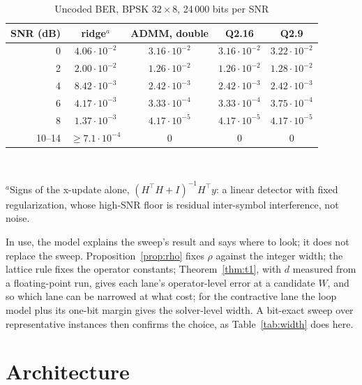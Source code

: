 \documentclass[conference]{IEEEtran}
\begin{document}
\begin{table}[t]
\centering\footnotesize\setlength{\tabcolsep}{4pt}
\caption{Uncoded BER, BPSK $32\times8$, 24\,000 bits per SNR}
\label{tab:ber}
\begin{tabular}{rcccc}
\toprule
SNR (dB) & ridge$^a$ & ADMM, double & Q2.16 & Q2.9 \\
\midrule
0  & $4.06\cdot10^{-2}$ & $3.16\cdot10^{-2}$ & $3.16\cdot10^{-2}$ & $3.22\cdot10^{-2}$ \\
2  & $2.00\cdot10^{-2}$ & $1.26\cdot10^{-2}$ & $1.26\cdot10^{-2}$ & $1.28\cdot10^{-2}$ \\
4  & $8.42\cdot10^{-3}$ & $2.42\cdot10^{-3}$ & $2.42\cdot10^{-3}$ & $2.42\cdot10^{-3}$ \\
6  & $4.17\cdot10^{-3}$ & $3.33\cdot10^{-4}$ & $3.33\cdot10^{-4}$ & $3.75\cdot10^{-4}$ \\
8  & $1.37\cdot10^{-3}$ & $4.17\cdot10^{-5}$ & $4.17\cdot10^{-5}$ & $4.17\cdot10^{-5}$ \\
10--14 & $\ge7.1\cdot10^{-4}$ & 0 & 0 & 0 \\
\bottomrule
\end{tabular}\\[2pt]
\raggedright\scriptsize $^a$Signs of the x-update alone, $(H^{\top}H+I)^{-1}H^{\top}y$:
a linear detector with fixed regularization, whose high-SNR floor is residual
inter-symbol interference, not noise.
\end{table}

In use, the model explains the sweep's result and says where to look; it
does not replace the sweep.
Proposition~\ref{prop:rho} fixes $\rho$ against the integer width; the
lattice rule fixes the operator constants; Theorem~\ref{thm:t1}, with $d$
measured from a floating-point run, gives each lane's operator-level error at
a candidate $W$, and so which lane can be narrowed at what cost; for the
contractive lane the loop model plus its one-bit margin gives the solver-level
width. A bit-exact sweep over representative instances then confirms the
choice, as Table~\ref{tab:width} does here.

\section{Architecture}
\label{sec:arch}
\end{document}
